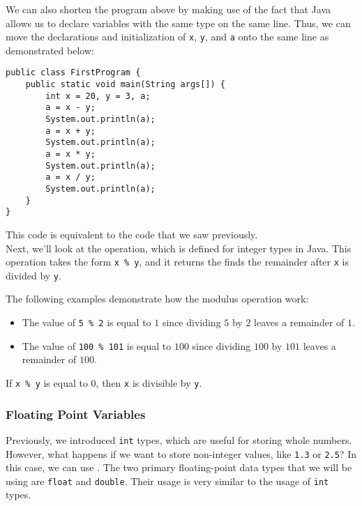 We can also shorten the program above by making use of the fact that Java allows us to declare variables with the same type on the same line. Thus, we can move the declarations and initialization of \verb!x!, \verb!y!, and \verb!a! onto the same line as demonstrated below:

\begin{lstlisting}
public class FirstProgram {
    public static void main(String args[]) {
        int x = 20, y = 3, a;
        a = x - y;
        System.out.println(a);
        a = x + y;
        System.out.println(a);
        a = x * y;
        System.out.println(a);
        a = x / y;
        System.out.println(a);
    }
}
\end{lstlisting}

This code is equivalent to the code that we saw previously. \\

Next, we'll look at the  operation, which is defined for integer types in Java. This operation takes the form \verb!x % y!, and it returns the finds the remainder after \verb!x! is divided by \verb!y!. 

\begin{example}
The following examples demonstrate how the modulus operation work:
\begin{itemize}
    \item The value of \verb!5 % 2! is equal to $1$ since dividing $5$ by $2$ leaves a remainder of $1$.
    \item The value of \verb!100 % 101! is equal to $100$ since dividing $100$ by $101$ leaves a remainder of $100$. 
\end{itemize} 
\end{example}

\begin{fact}
If \verb!x % y! is equal to $0$, then \verb!x! is divisible by \verb!y!. 
\end{fact}


\subsubsection{Floating Point Variables}

Previously, we introduced \verb!int! types, which are useful for storing whole numbers. However, what happens if we want to store non-integer values, like \verb!1.3! or \verb!2.5!? In this case, we can use . The two primary floating-point data types that we will be using are \verb!float! and \verb!double!. Their usage is very similar to the usage of \verb!int! types. \\

